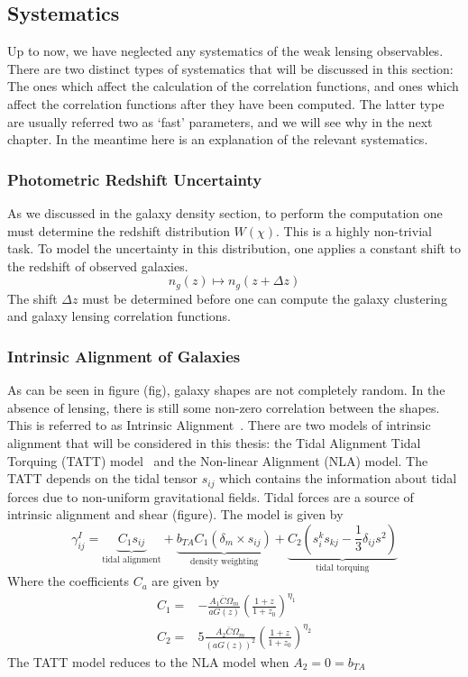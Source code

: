 \subsection{Systematics}
Up to now, we have neglected any systematics of the weak lensing observables. There are two distinct types of systematics that will be discussed in this section: The ones which affect the calculation of the correlation functions, and ones which affect the correlation functions after they have been computed. The latter type are usually referred two as `fast' parameters, and we will see why in the next chapter. In the meantime here is an explanation of the relevant systematics.
\subsubsection{Photometric Redshift Uncertainty}
As we discussed in the galaxy density section, to perform the computation one must determine the redshift distribution $W(\chi)$. This is a highly non-trivial task. To model the uncertainty in this distribution, one applies a constant shift to the redshift of observed galaxies.
\begin{equation}
	n_g(z) \mapsto n_g(z+\Delta z)
\end{equation}
The shift $\Delta z$ must be determined before one can compute the galaxy clustering and galaxy lensing correlation functions.
\subsubsection{Intrinsic Alignment of Galaxies}
As can be seen in figure (fig), galaxy shapes are not completely random. In the absence of lensing, there is still some non-zero correlation between the shapes. This is referred to as Intrinsic Alignment~\cite{troxel_intrinsic_2015,scott_dodelson_modern_2021}. There are two models of intrinsic alignment that will be considered in this thesis: the Tidal Alignment Tidal Torquing (TATT) model~\cite{krause_dark_2021,blazek_beyond_2019} and the Non-linear Alignment (NLA) model. The TATT depends on the tidal tensor $s_{ij}$ which contains the information about tidal forces due to non-uniform gravitational fields. Tidal forces are a source of intrinsic alignment and shear (figure). The model is given by
\begin{equation}
	\gamma_{ij}^I = \underbrace{C_1s_{ij}}_{\text{tidal alignment}}+
	\underbrace{b_{TA}C_1(\delta_m\times s_{ij})}_{\text{density weighting}}+
	\underbrace{C_2\left( s_i^ks_{kj}-\frac{1}{3}\delta_{ij}s^2 \right)}_{\text{tidal torquing}}
\end{equation}
Where the coefficients $C_a$ are given by
\begin{equation}
	\begin{split}
		C_1 =& -\frac{A_1\bar{C}\Omega_m}{aG(z)}\left(\frac{1+z}{1+z_0}\right)^{\eta_1} \\
		C_2 =& 5\frac{A_2\bar{C}\Omega_m}{(aG(z))^2}\left(\frac{1+z}{1+z_0}\right)^{\eta_2}
	\end{split}
\end{equation}
The TATT model reduces to the NLA model when $A_2=0=b_{TA}$
